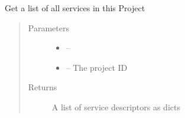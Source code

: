 \documentclass[letterpaper,10pt,english]{sphinxmanual}
\begin{document}
\begin{fulllineitems}
\label{_source/son_editor.impl:son_editor.impl.servicesimpl.get_services}
Get a list of all services in this Project
\begin{quote}\begin{description}
\item[{Parameters}] \leavevmode\begin{itemize}
\item {} 
 -- 

\item {} 
 -- The project ID

\end{itemize}

\item[{Returns}] \leavevmode
A list of service descriptors as dicts

\end{description}\end{quote}

\end{fulllineitems}


\begin{fulllineitems}
\label{_source/son_editor.impl:son_editor.impl.servicesimpl.get_uid}
\end{fulllineitems}


\begin{fulllineitems}
\label{_source/son_editor.impl:son_editor.impl.servicesimpl.replace_service_refs}
\end{fulllineitems}

\end{document}
